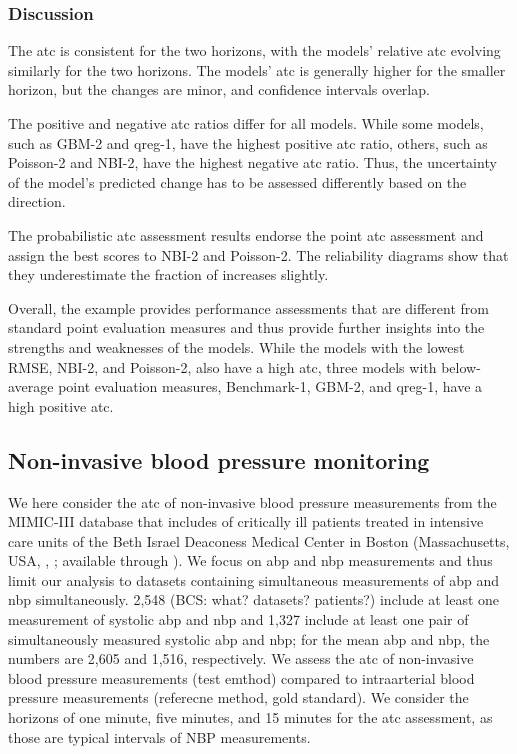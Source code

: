 \documentclass[pdflatex]{sn-jnl}
\theoremstyle{plain}%
\theoremstyle{definition}
\begin{document}
\subsubsection*{Discussion}

The \ac{atc} is consistent for the two horizons, with the models' relative \ac{atc} evolving similarly for the two horizons.
The models' \ac{atc} is generally higher for the smaller horizon, but the changes are minor, and confidence intervals overlap.

The positive and negative \ac{atc} ratios differ for all models.
While some models, such as GBM-2 and qreg-1, have the highest positive \ac{atc} ratio, others, such as Poisson-2 and NBI-2, have the highest negative \ac{atc} ratio.
Thus, the uncertainty of the model's predicted change has to be assessed differently based on the direction.

The probabilistic \ac{atc} assessment results endorse the point \ac{atc} assessment and assign the best scores to NBI-2 and Poisson-2.
The reliability diagrams show that they underestimate the fraction of increases slightly.

Overall, the example provides performance assessments that are different from standard point evaluation measures and thus provide further insights into the strengths and weaknesses of the models.
While the models with the lowest RMSE, NBI-2, and Poisson-2, also have a high \ac{atc}, three models with below-average point evaluation measures, Benchmark-1, GBM-2, and qreg-1, have a high positive \ac{atc}.


\subsection{Non-invasive blood pressure monitoring} \label{sec:application_measurement}

We here consider the \ac{atc} of non-invasive blood pressure measurements from the MIMIC-III database that includes of critically ill patients treated in intensive care units of the Beth Israel Deaconess Medical Center in Boston (Massachusetts, USA, \cite{Johnson2016}, \citealp{Moody2017}; available through \citealp{Goldberger2000}).
We focus on \acf{abp} and \acf{nbp} measurements and thus limit our analysis to datasets containing simultaneous measurements of \ac{abp} and \ac{nbp} simultaneously. 2,548 (BCS: what? datasets? patients?) include at least one measurement of systolic \ac{abp} and \ac{nbp} and 1,327 include at least one pair of simultaneously measured systolic \ac{abp} and \ac{nbp}; for the mean \ac{abp} and \ac{nbp}, the numbers are 2,605 and 1,516, respectively.
We assess the \ac{atc} of non-invasive blood pressure measurements (test emthod) compared to intraarterial blood pressure measurements (referecne method, gold standard).
We consider the horizons of one minute, five minutes, and 15 minutes for the \ac{atc} assessment, as those are typical intervals of NBP measurements.
\end{document}
